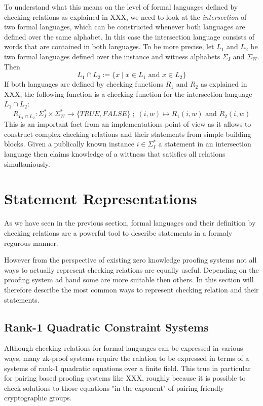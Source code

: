 To understand what this means on the level of formal languages defined by checking relations as explained in XXX, we need to look at the \textit{intersection} of two formal languages, which can be constructed whenever both languages are defined over the same alphabet. In this case the intersection language consists of words that are contained in both languages. To be more precise, let $L_1$ and $L_2$ be two formal languages defined over the instance and witness alphabets $\Sigma_I$ and $\Sigma_W$. Then
\begin{equation}
L_1 \cap L_2 := \{x\;|\; x\in L_1 \text{ and } x\in L_2\}
\end{equation} 
If both languages are defined by checking functions $R_1$ and $R_2$ as explained in XXX, the following function is a checking function for the intersection language $L_1 \cap L_2$:
\begin{equation}
R_{L_1 \cap L_2}: \Sigma_I^* \times \Sigma_W^* \to \{TRUE, FALSE\}\;;\;
(i,w) \mapsto R_1(i,w) \text{ and } R_2(i,w)
\end{equation}
This is an important fact from an implementations point of view as it allows to construct complex checking relations and their statements from simple building blocks. Given a publically known instance $i\in \Sigma_I^*$ a statement in an intersection language then claims knowledge of a wittness that satisfies all relations simultaniously.

\section{Statement Representations} As we have seen in the previous section, formal languages and their definition by checking relations are a powerful tool to describe statements in a formaly regurous manner. 

However from the perspective of existing zero knowledge proofing systems not all ways to actually represent checking relations are equally useful. Depending on the proofing system ad hand some are more suitable then others. In this section will therefore describe the most common ways to represent checking relation and their statements.
\subsection{Rank-1 Quadratic Constraint Systems}
Although checking relations for formal languages can be expressed in various ways, many zk-proof systems require the ralation to be expressed in terms of a systems of rank-1 quadratic equations over a finite field. This true in particular for pairing based proofing systems like XXX, roughly because it is possible to check solutions to those equations "in the exponent" of pairing friendly cryptographic groups. 

